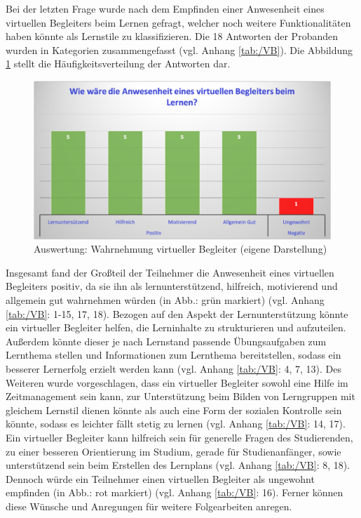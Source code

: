 Bei der letzten Frage wurde nach dem Empfinden einer Anwesenheit eines virtuellen Begleiters beim Lernen gefragt, welcher
noch weitere Funktionalitäten haben könnte als Lernstile zu klassifizieren.	Die 18 Antworten der Probanden wurden in 
Kategorien zusammengefasst (vgl. Anhang  \ref{tab:/VB}). Die Abbildung \ref{fig:vb} stellt die Häufigkeitsverteilung der Antworten dar.
\begin{figure}[H]
    \centering
    \includegraphics[width=0.8\linewidth]{images/Auswertung/VB.png}
   \caption[Auswertung: Wahrnehmung virtueller Begleiter] {Auswertung: Wahrnehmung virtueller Begleiter (eigene Darstellung)}
  \label{fig:vb}
\end{figure} 
Insgesamt fand der Großteil der Teilnehmer die Anwesenheit eines virtuellen Begleiters positiv,
da sie ihn als lernunterstützend, hilfreich, motivierend und allgemein gut wahrnehmen würden (in Abb.: grün markiert) (vgl. Anhang  \ref{tab:/VB}: 1-15, 17, 18).
Bezogen auf den Aspekt der Lernunterstützung könnte ein virtueller Begleiter helfen, die Lerninhalte
zu strukturieren und aufzuteilen. Außerdem könnte dieser je nach Lernstand passende 
Übungsaufgaben zum Lernthema stellen und Informationen zum Lernthema bereitstellen,
sodass ein besserer Lernerfolg erzielt werden kann (vgl. Anhang  \ref{tab:/VB}: 4, 7, 13).
Des Weiteren wurde vorgeschlagen, dass ein virtueller Begleiter 
sowohl eine Hilfe im Zeitmanagement sein kann, zur
Unterstützung beim Bilden von Lerngruppen mit gleichem Lernstil dienen könnte
als auch eine Form der sozialen Kontrolle sein könnte, sodass es leichter fällt 
stetig zu lernen (vgl. Anhang  \ref{tab:/VB}: 14, 17).
Ein virtueller Begleiter kann hilfreich sein für generelle Fragen des Studierenden,
zu einer besseren Orientierung im Studium, gerade für Studienanfänger, sowie
unterstützend sein beim Erstellen des Lernplans (vgl. Anhang  \ref{tab:/VB}: 8, 18).
Dennoch würde ein Teilnehmer einen virtuellen Begleiter als ungewohnt empfinden (in Abb.: rot markiert) (vgl. Anhang  \ref{tab:/VB}: 16).
Ferner können diese Wünsche und Anregungen für weitere Folgearbeiten anregen.

